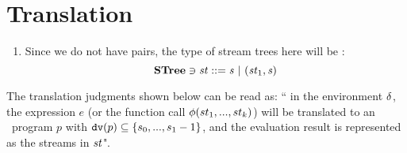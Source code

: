 \section{Translation}

\begin{enumerate}[(1)]
	\item Since we do not have pairs, the type of stream trees here will be : $$ \STree \ni \st ::= \s \ | \ (\st_1,\s) $$

%	

\end{enumerate}
	
The translation judgments shown below can be read as: `` in the environment $\delta$, the expression $e$ (or the function call $\phi(st_1,...,st_k)$) will be translated to an \fmsvcode \  program $p$ with $\mathtt{dv}(p) \subseteq \{s_0,...,s_1 -1\}$, and the evaluation result is represented as the streams in $\mathit{st}$". 
	
